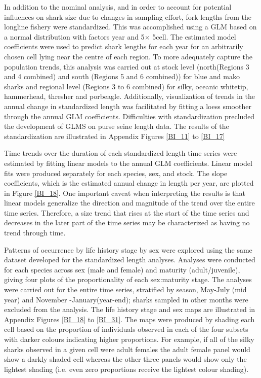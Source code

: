 \documentclass[12pt]{SCreport}
\begin{document}
In addition to the nominal analysis, and in order to account for potential influences on shark size due to changes in sampling effort, fork lengths from the longline fishery were standardized. This was accomplished using a GLM based on a normal distribution with factors year and 5\degree $\times$ 5\degree cell. The estimated model coefficients were used to predict shark lengths for each year for an arbitrarily chosen cell lying near the centre of each region. To more adequately capture the population trends, this analysis was carried out at stock level (north(Regions 3 and 4 combined) and south (Regions 5 and 6 combined)) for blue and mako sharks and regional level (Regions 3 to 6 combined) for silky, oceanic whitetip, hammerhead, thresher and porbeagle.  Additionally, visualization of trends in the annual change in standardized length was facilitated by fitting a loess smoother through the annual GLM coefficients.  Difficulties with standardization precluded the development of GLMS on purse seine length data. The results of the standardization are illustrated in Appendix Figures \ref{BI_11} to \ref{BI_17}

Time trends over the duration of each standardized length time series were estimated by fitting linear models to the annual GLM coefficients.  Linear model fits were produced separately for each species, sex, and stock.   The slope coefficients, which is the estimated annual change in length per year, are plotted in Figure \ref{BI_18}.  One important caveat when interpreting the results is that linear models generalize the direction and magnitude of the trend over the entire time series. Therefore, a size trend that rises at the start of the time series and decreases in the later part of the time series may be characterized as having no trend through time.


Patterns of occurrence by life history stage by sex were explored using the same dataset developed for the standardized length analyses.  Analyses were conducted for each species  across sex (male and female) and maturity (adult/juvenile), giving four plots of the proportionality of each sex:maturity stage.  The analyses were carried out for the entire time series, stratified by season,  May-July (mid year) and November -January(year-end); sharks sampled in other months were excluded from the analysis.  The life history stage and sex maps are illustrated in Appendix Figures \ref{BI_18} to \ref{BI_31}.  The maps were produced by shading each cell based on the proportion of individuals observed in each of the four subsets with darker colours indicating higher proportions. For example, if all of the silky sharks observed in a given cell were adult females the adult female panel would show a darkly shaded cell whereas the other three panels would show only the lightest shading (i.e. even zero proportions receive the lightest colour shading). 
\end{document}
